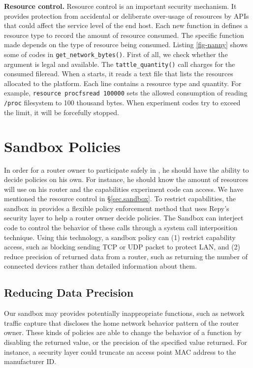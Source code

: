 

\textbf{Resource control.} Resource control is an important security mechanism. It provides protection from accidental or deliberate over-usage of resources by APIs that could affect the service level of the end host. Each new function in \sandboxname defines a resource type to record the amount of resource consumed. The specific function made depends on the type of resource being consumed. Listing \ref{fig-nanny} shows some of codes in \texttt{get\_network\_bytes()}. First of all, we check whether the argument is legal and available. The \texttt{tattle\_quantity()} call charges for the consumed fileread. When a \sysname starts, it reads a text file that lists the resources allocated to the platform. Each line contains a resource type and quantity. For example, \texttt{resource procfsread 100000} sets the allowed consumption of reading \texttt{/proc} filesystem to 100 thousand bytes. When experiment codes try to exceed the limit, it will be forcefully stopped.

\section{Sandbox Policies}
\label{sec.policy}
In order for a router owner to participate safely in \sysname, he should have the ability to decide policies on his own. For instance, he should know the amount of resources \sysname will use on his router and the capabilities experiment code can access. We have mentioned the resource control in \S{\ref{sec.sandbox}}. To restrict capabilities, the sandbox in \sysname provides a flexible policy enforcement method that uses Repy's security layer to help a router owner decide policies. The Sandbox can interject code to control the behavior of these calls through a system call interposition technique. Using this technology, a sandbox policy can (1) restrict capability access, such as blocking sending TCP or UDP packet to protect LAN, and (2) reduce precision of returned data from a router, such as returning the number of connected devices rather than detailed information about them.

\subsection{Reducing Data Precision}
Our sandbox may provides potentially inappropriate functions, such as network traffic capture that discloses the home network behavior pattern of the router owner. These kinds of policies are able to change the behavior of a function by disabling the returned value, or the precision of the specified value returned. For instance, a security layer could truncate an access point MAC address to the manufacturer ID.

